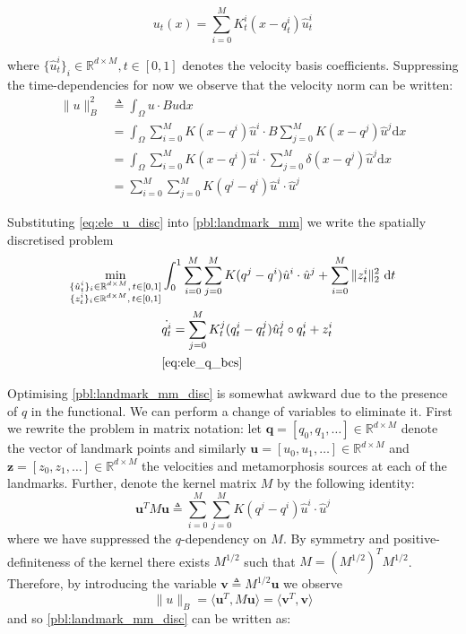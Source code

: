\documentclass{article}
\newcommand{\norm}[2]{\| #1 \|_{ #2 }}
\newcommand{\bnorm}[1]{\norm{ #1 }{B}}
\newcommand{\ltwonorm}[1]{\norm{ #1 }{2}}
\newcommand{\diff}[1]{\text{d} #1}
\newcommand{\Q}{\mathbf{q}}
\newcommand{\U}{\mathbf{u}}
\newcommand{\Z}{\mathbf{z}}
\newcommand{\V}{\mathbf{v}}
\begin{document}
\begin{equation}
u_t(x) = \sum_{i=0}^M K^i_t(x - q^i_t)\hat u^i_t \label{eq:ele_u_disc}
\end{equation}

where $\{\hat u^i_t\}_i \in \mathbb{R}^{d\times M}, t\in[0,1]$ denotes the
velocity basis coefficients. Suppressing the time-dependencies for now we
observe that the velocity norm can be written:
\begin{align*}
\bnorm{u}^2 & \triangleq \int_\Omega u\cdot Bu \diff{x}\\
            & = \int_\Omega\sum_{i=0}^M K(x-q^i)\hat u^i \cdot B \sum_{j=0}^M
            K(x-q^j)\hat u^j \diff{x}\\
            & = \int_\Omega \sum_{i=0}^M K(x-q^i)\hat u^i \cdot \sum_{j=0}^M
            \delta (x-q^j)\hat u^j \diff{x}\\
            & = \sum_{i=0}^M \sum_{j=0}^M K(q^j-q^i)\hat u^i \cdot\hat u^j
\end{align*}

Substituting \eqref{eq:ele_u_disc} into
\eqref{pbl:landmark_mm} we write the spatially discretised problem
\begin{subequations}\label{pbl:landmark_mm_disc}
\begin{align}
\min_{\substack{\{\hat u^i_t\}_i \in \mathbb{R}^{d\times M},\, t\in[0,1]\\
\{z^i_t\}_i \in \mathbb{R}^{d\times M},\, t\in[0,1]}} & \int_0^1 \sum_{i=0}^M
\sum_{j=0}^M K(q^j-q^i)\hat u^i \cdot\hat u^j+ \sum_{i=0}^M
\ltwonorm{z^i_t}^2 \diff{t}\\
            & \dot{q^i_t} = \sum_{j=0}^M K^j_t(q^i_t-q^j_t)\hat u^j_t \circ
            q^i_t + z^i_t \label{eq:ele_q_disc} \\
            & \eqref{eq:ele_q_bcs}\nonumber
\end{align}
\end{subequations}

Optimising \eqref{pbl:landmark_mm_disc} is somewhat awkward due to the presence
of $q$ in the functional. We can perform a change of variables to eliminate it.
First we rewrite the problem in matrix notation: let $\Q = [q_0, q_1,
\ldots]\in\mathbb{R}^{d\times M}$ denote the vector of landmark points and
similarly $\U = [u_0, u_1, \ldots]\in\mathbb{R}^{d\times M}$ and $\Z = [z_0,
z_1, \ldots]\in\mathbb{R}^{d\times M}$ the velocities and metamorphosis sources
at each of the landmarks. Further, denote the kernel matrix $M$ by the following
identity:
\[
\U^T M \U \triangleq \sum_{i=0}^M \sum_{j=0}^M K(q^j-q^i)\hat u^i \cdot\hat u^j
\]
where we have suppressed the $q$-dependency on $M$. By symmetry and
positive-definiteness of the kernel there exists $M^{1/2}$ such that $M =
(M^{1/2})^T M^{1/2}$. Therefore, by introducing the variable $\V \triangleq
M^{1/2}\U$ we observe
\[
\bnorm{u} = \langle\U^T, M \U\rangle = \langle\V^T,\V\rangle
\]
and so \eqref{pbl:landmark_mm_disc} can be written as:
\end{document}
